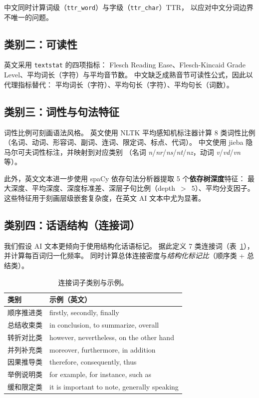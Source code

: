 \documentclass[sigconf]{acmart}
\begin{document}
中文同时计算词级（\texttt{ttr\_word}）与字级（\texttt{ttr\_char}）TTR，
以应对中文分词边界不唯一的问题。

\subsection{类别二：可读性}

英文采用 \texttt{textstat} 的四项指标：
Flesch Reading Ease、Flesch-Kincaid Grade Level、平均词长（字符）与平均音节数。
中文缺乏成熟音节可读性公式，因此以代理指标替代：
平均词长（字符）、平均句长（字符）、平均句长（词数）。

\subsection{类别三：词性与句法特征}

词性比例可刻画语法风格。
英文使用 NLTK 平均感知机标注器计算 8 类词性比例
（名词、动词、形容词、副词、连词、限定词、标点、代词）。
中文使用 jieba 隐马尔可夫词性标注，并映射到对应类别
（名词 \textit{n}/\textit{nr}/\textit{ns}/\textit{nt}/\textit{nz}，动词 \textit{v}/\textit{vd}/\textit{vn} 等）。

此外，英文文本进一步使用 spaCy 依存句法分析器提取 5 个\textbf{依存树深度}特征：
最大深度、平均深度、深度标准差、深层子句比例（depth~$>$~5）、平均分支因子。
这些特征用于刻画层级嵌套复杂度，在英文 AI 文本中尤为显著。

\subsection{类别四：话语结构（连接词）}

我们假设 AI 文本更倾向于使用结构化话语标记。
据此定义 7 类连接词（表~\ref{tab:transitions}），并计算每百词归一化频率。
同时计算总体连接密度与\textit{结构化标记比}（顺序类 + 总结类）。

\begin{table}[h]
\centering
\caption{连接词子类别与示例。}
\label{tab:transitions}
\small
\begin{tabular}{ll}
\toprule
\textbf{类别} & \textbf{示例（英文）} \\
\midrule
顺序推进类 & firstly, secondly, finally \\
总结收束类 & in conclusion, to summarize, overall \\
转折对比类 & however, nevertheless, on the other hand \\
并列补充类 & moreover, furthermore, in addition \\
因果推导类 & therefore, consequently, thus \\
举例说明类 & for example, for instance, such as \\
缓和限定类 & it is important to note, generally speaking \\
\bottomrule
\end{tabular}
\end{table}
\end{document}
